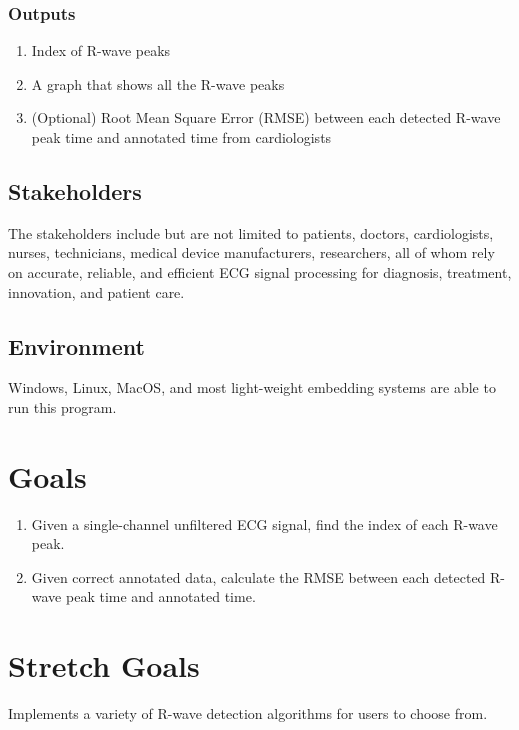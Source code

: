 \documentclass{article}
\begin{document}
\subsubsection{Outputs}

\begin{enumerate}
    \item Index of R-wave peaks
    \item A graph that shows all the R-wave peaks
    \item (Optional) Root Mean Square Error (RMSE) between each detected R-wave peak time and annotated time from cardiologists
\end{enumerate}

\subsection{Stakeholders}

The stakeholders include but are not limited to patients, doctors, cardiologists, nurses, technicians, medical device manufacturers, researchers, all of whom rely on accurate, reliable, and efficient ECG signal processing for diagnosis, treatment, innovation, and patient care.

\subsection{Environment}

Windows, Linux, MacOS, and most light-weight embedding systems are able to run this program.

\section{Goals}

\begin{enumerate}
    \item Given a single-channel unfiltered ECG signal, find the index of each R-wave peak.
    \item Given correct annotated data, calculate the RMSE between each detected R-wave peak time and annotated time.
\end{enumerate}

\section{Stretch Goals}

Implements a variety of R-wave detection algorithms for users to choose from.
\end{document}

